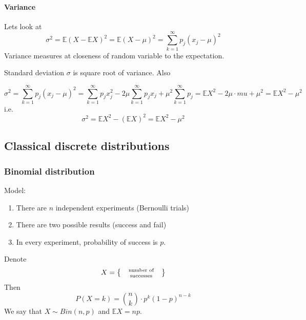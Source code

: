 \paragraph{Variance} Lets look at
$$\sigma^2 = \mathbb{E} (X-\mathbb{E}X)^2 = \mathbb{E}(X-\mu)^2 = \sum_{k=1}^\infty p_j (x_j - \mu)^2$$
Variance measures at closeness of random variable to the expectation.

Standard deviation $\sigma$ is square root of variance.
Also

$$\sigma^2 = \sum_{k=1}^\infty p_j (x_j - \mu)^2 = \sum_{k=1}^\infty p_j x_j^2 -2\mu \sum_{k=1}^\infty p_jx_j + \mu^2 \sum_{k=1}^\infty p_j =  \mathbb{E}X^2 - 2\mu \cdot mu + \mu^2 = \mathbb{E}X^2 - \mu^2$$
i.e.
$$\sigma^2 = \mathbb{E}X^2 - (\mathbb{E}X)^2 = \mathbb{E}X^2 - \mu^2$$

\subsection{Classical discrete distributions}
\subsubsection{Binomial distribution}
Model:
\begin{enumerate}
	\item There are $n$ independent experiments (Bernoulli trials)
	\item There are two possible results (success and fail)
	\item In every experiment, probability of success is $p$.
\end{enumerate}
Denote
$$X  =\left\{ \parbox{2cm}{\centering \scriptsize number of successes} \right\}$$
Then
$$P(X=k) = \binom{n}{k} \cdot p^k (1-p)^{n-k}$$
We say that $X \sim Bin(n,p)$ and $\mathbb{E}X = np$.